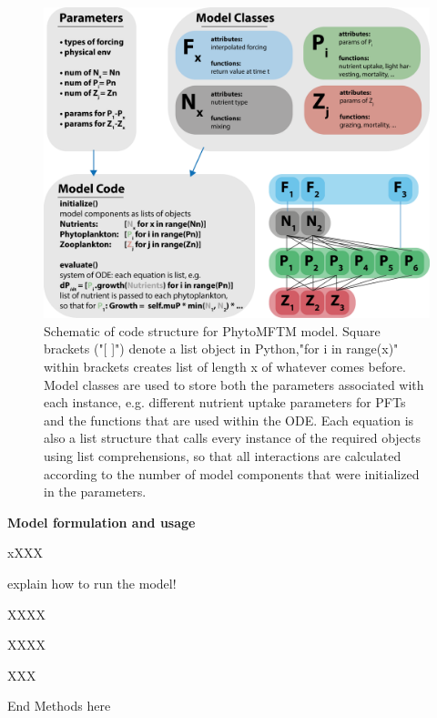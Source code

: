 \begin{figure}
\centering
\includegraphics[trim = 0mm 0mm 0mm 0mm, clip, width=.9\linewidth]{./Chp22-Pre2/OOPmodelstructureDraft.png}
\caption[Scheme]{\small {Schematic of code structure for PhytoMFTM model. Square brackets ("[ ]") denote a list object in Python,"for i in range(x)" within brackets creates list of length x of whatever comes before. Model classes are used to store both the parameters associated with each instance, e.g. different nutrient uptake parameters for PFTs and the functions that are used within the ODE. Each equation is also a list structure that calls every instance of the required objects using list comprehensions, so that all interactions are calculated according to the number of model components that were initialized in the parameters.}}
\label{PrinComp}
\end{figure}


\noindent \small {\textbf{Model formulation and usage}}

xXXX

explain how to run the model!

XXXX

XXXX

XXX


End Methods here
